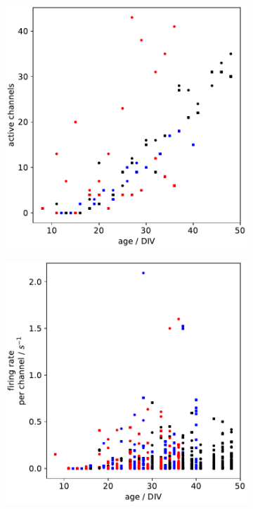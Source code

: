 \documentclass[11pt]{article}
\begin{document}
{\begin{figure}
\begin{subfigure}[b]{0.45\textwidth}
	\centering
	\includegraphics[width=\textwidth]{../plots/development_plots_channels.pdf}
\end{subfigure}
\hfill
\begin{subfigure}[b]{0.45\textwidth}
	\centering
	\includegraphics[width=\textwidth]{../plots/development_plots_fr_perchan.pdf}
\end{subfigure}


\end{figure}}
\end{document}
